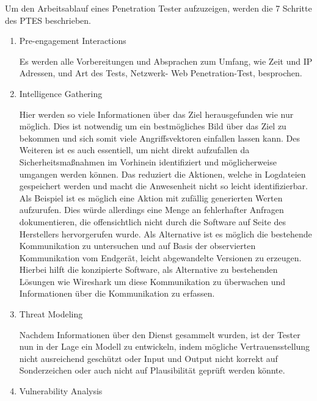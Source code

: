     Um den Arbeitsablauf eines Penetration Tester aufzuzeigen, werden die 7 Schritte des \ac{PTES} \cite{hsiangchih_2019}
    beschrieben.
    \begin{enumerate}
        \item \glqq Pre-engagement Interactions\grqq{}
        
        Es werden alle Vorbereitungen und Absprachen zum Umfang, wie Zeit und IP Adressen, und Art des Tests, Netzwerk- Web Penetration-Test, besprochen.
        \item \glqq Intelligence Gathering\grqq{}
        
        Hier werden so viele Informationen über das Ziel herausgefunden wie nur möglich. Dies ist notwendig um ein bestmögliches Bild über das Ziel zu bekommen und sich somit viele Angriffsvektoren einfallen lassen kann. Des Weiteren ist es auch essentiell, um nicht direkt aufzufallen da Sicherheitsmaßnahmen im Vorhinein identifiziert und möglicherweise umgangen werden können. Das reduziert die Aktionen, welche in Logdateien gespeichert werden und macht die Anwesenheit nicht so leicht identifizierbar. Als Beispiel ist es möglich eine Aktion mit zufällig generierten Werten aufzurufen. Dies würde allerdings eine Menge an fehlerhafter Anfragen dokumentieren, die offensichtlich nicht durch die Software auf Seite des Herstellers hervorgerufen wurde. Als Alternative ist es möglich die bestehende Kommunikation zu untersuchen und auf Basis der observierten Kommunikation vom Endgerät, leicht abgewandelte Versionen zu erzeugen. Hierbei hilft die konzipierte Software, als Alternative zu bestehenden Lösungen wie Wireshark um diese Kommunikation zu überwachen und Informationen über die Kommunikation zu erfassen.
        \item \glqq Threat Modeling\grqq{}
        
        Nachdem Informationen über den Dienst gesammelt wurden, ist der Tester nun in der Lage ein Modell zu entwickeln, indem mögliche Vertrauensstellung nicht ausreichend geschützt oder Input und Output nicht korrekt auf Sonderzeichen oder auch nicht auf Plausibilität geprüft werden könnte. 
        \item \glqq Vulnerability Analysis\grqq{}
        

\end{enumerate}
